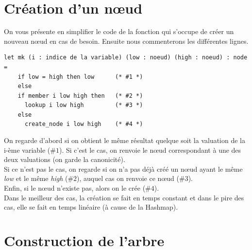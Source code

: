 \documentclass[a4paper, oneside]{report}
\begin{document}
\section{Création d'un nœud}

On vous présente en simplifier le code de la fonction qui s'occupe de créer un nouveau nœud en cas de besoin. Ensuite nous commenterons les différentes lignes.
\begin{lstlisting}
let mk (i : indice de la variable) (low : noeud) (high : noeud) : node =
    if low = high then low      (* #1 *)
    else
    if member i low high then   (* #2 *)
      lookup i low high         (* #3 *)
    else
      create_node i low high    (* #4 *)
\end{lstlisting}
On regarde d'abord si on obtient le même résultat quelque soit la valuation de la i-ème variable ($\#1$). Si c'est le cas, on renvoie le nœud correspondant à une des deux valuations (on garde la canonicité).\\
Si ce n'est pas le cas, on regarde si on n'a pas déjà créé un nœud ayant le même \textit{low} et le même \textit{high} ($\#2$), auquel cas on renvoie ce nœud ($\#3$).\\
Enfin, si le nœud n'existe pas, alors on le crée ($\#4$).\\
Dans le meilleur des cas, la création se fait en temps constant et dans le pire des cas, elle se fait en temps linéaire (à cause de la Hashmap).

\section{Construction de l'arbre}
\end{document}
